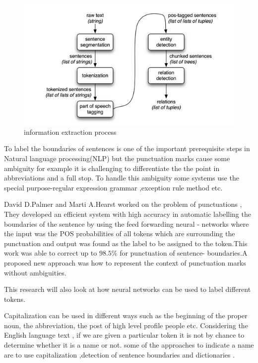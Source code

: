 \begin{itemize}
\begin{figure}[hbtp]
\caption{information extraction process}
\centering
\includegraphics[scale=0.4]{images/nltk.png}
\end{figure}
\end{itemize}

To label the boundaries of sentences is one of the important prerequisite steps in Natural language processing(NLP) but the punctuation marks cause some ambiguity \citep{palmer1994adaptive} for example it is challenging to differentiate the the point in abbreviations and a full stop. 
To handle this ambiguity some systems use the special purpose-regular expression grammar ,exception rule method etc.

David D.Palmer and Marti A.Hearst worked on the problem of punctuations \citep{palmer1994adaptive}, They developed an efficient system with high accuracy in automatic labelling the boundaries of the sentence  by using the feed forwarding neural - networks where the input was the POS probabilities of all tokens which are surrounding the punctuation  and output was found as the label to be assigned to the token.This work was able to correct up to $98.5\%$ for punctuation of  sentence- boundaries.A proposed  new approach was how to  represent the context of punctuation marks without ambiguities.

This research will also look at how neural networks can be used to label different tokens.

Capitalization can be used in different ways such as the beginning of the proper noun, the abbreviation, the post of high level profile people etc. Considering the English language text , if we are given a  particular token it is not by chance  to  determine whether it is a name or not. some of the approaches to indicate a name are to  use capitalization ,detection of sentence boundaries and dictionaries \citep{baluja2000applying}.

